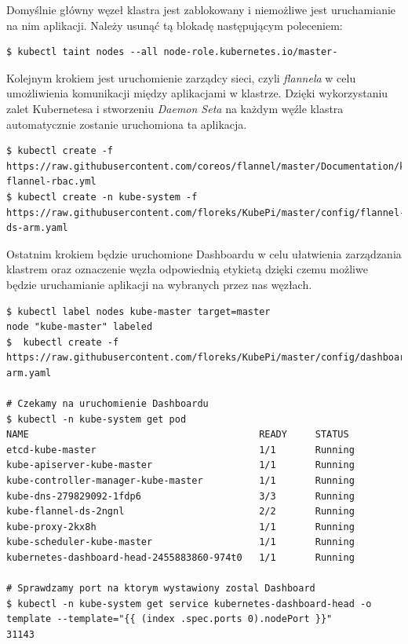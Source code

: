 \documentclass[12pt]{report}
\begin{document}
{Domyślnie główny węzeł klastra jest zablokowany i niemożliwe jest uruchamianie na nim aplikacji. Należy usunąć tą blokadę następującym poleceniem:

\begin{lstlisting}
$ kubectl taint nodes --all node-role.kubernetes.io/master-
\end{lstlisting}

Kolejnym krokiem jest uruchomienie zarządcy sieci, czyli \textit{flannela} w celu umożliwienia komunikacji między aplikacjami w klastrze. Dzięki wykorzystaniu zalet Kubernetesa i stworzeniu \textit{Daemon Seta} na każdym węźle klastra automatycznie zostanie uruchomiona ta aplikacja.

\begin{lstlisting}
$ kubectl create -f https://raw.githubusercontent.com/coreos/flannel/master/Documentation/kube-flannel-rbac.yml
$ kubectl create -n kube-system -f https://raw.githubusercontent.com/floreks/KubePi/master/config/flannel-ds-arm.yaml
\end{lstlisting}

Ostatnim krokiem będzie uruchomione Dashboardu w celu ułatwienia zarządzania klastrem oraz oznaczenie węzła odpowiednią etykietą dzięki czemu możliwe będzie uruchamianie aplikacji na wybranych przez nas węzłach. 

\begin{lstlisting}[float,floatplacement=H]
$ kubectl label nodes kube-master target=master
node "kube-master" labeled
$  kubectl create -f https://raw.githubusercontent.com/floreks/KubePi/master/config/dashboard-arm.yaml

# Czekamy na uruchomienie Dashboardu
$ kubectl -n kube-system get pod
NAME                                         READY     STATUS
etcd-kube-master                             1/1       Running
kube-apiserver-kube-master                   1/1       Running
kube-controller-manager-kube-master          1/1       Running
kube-dns-279829092-1fdp6                     3/3       Running
kube-flannel-ds-2ngnl                        2/2       Running
kube-proxy-2kx8h                             1/1       Running
kube-scheduler-kube-master                   1/1       Running
kubernetes-dashboard-head-2455883860-974t0   1/1       Running

# Sprawdzamy port na ktorym wystawiony zostal Dashboard
$ kubectl -n kube-system get service kubernetes-dashboard-head -o template --template="{{ (index .spec.ports 0).nodePort }}"
31143
\end{lstlisting}

}
\end{document}
